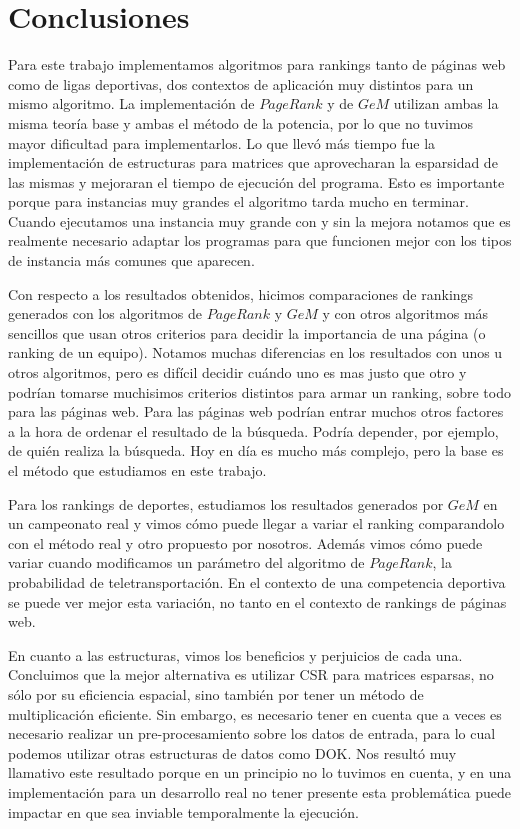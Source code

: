 \section{Conclusiones}

Para este trabajo implementamos algoritmos para rankings tanto de páginas web como de ligas deportivas, dos contextos de aplicación muy distintos para un mismo algoritmo. La implementación de $PageRank$ y de $GeM$ utilizan ambas la misma teoría base y ambas el método de la potencia, por lo que no tuvimos mayor dificultad para implementarlos. Lo que llevó más tiempo fue la implementación de estructuras para matrices que aprovecharan la esparsidad de las mismas y mejoraran el tiempo de ejecución del programa. Esto es importante porque para instancias muy grandes el algoritmo tarda mucho en terminar. Cuando ejecutamos una instancia muy grande con y sin la mejora notamos que es realmente necesario adaptar los programas para que funcionen mejor con los tipos de instancia más comunes que aparecen.

Con respecto a los resultados obtenidos, hicimos comparaciones de rankings generados con los algoritmos de $PageRank$ y $GeM$ y con otros algoritmos más sencillos que usan otros criterios para decidir la importancia de una página (o ranking de un equipo). Notamos muchas diferencias en los resultados con unos u otros algoritmos, pero es difícil decidir cuándo uno es mas justo que otro y podrían tomarse muchisimos criterios distintos para armar un ranking, sobre todo para las páginas web. Para las páginas web podrían entrar muchos otros factores a la hora de ordenar el resultado de la búsqueda. Podría depender, por ejemplo, de quién realiza la búsqueda. Hoy en día es mucho más complejo, pero la base es el método que estudiamos en este trabajo. 

Para los rankings de deportes, estudiamos los resultados generados por $GeM$ en un campeonato real y vimos cómo puede llegar a variar el ranking comparandolo con el método real y otro propuesto por nosotros. Además vimos cómo puede variar cuando modificamos un parámetro del algoritmo de $PageRank$, la probabilidad de teletransportación. En el contexto de una competencia deportiva se puede ver mejor esta variación, no tanto en el contexto de rankings de páginas web.


En cuanto a las estructuras, vimos los beneficios y perjuicios de cada una. Concluimos que la mejor alternativa es utilizar CSR para matrices esparsas, no sólo por su eficiencia espacial, sino también por tener un método de multiplicación eficiente. Sin embargo, es necesario tener en cuenta que a veces es necesario realizar un pre-procesamiento sobre los datos de entrada, para lo cual podemos utilizar otras estructuras de datos como DOK. Nos resultó muy llamativo este resultado porque en un principio no lo tuvimos en cuenta, y en una implementación para un desarrollo real no tener presente esta problemática puede impactar en que sea inviable temporalmente la ejecución.

